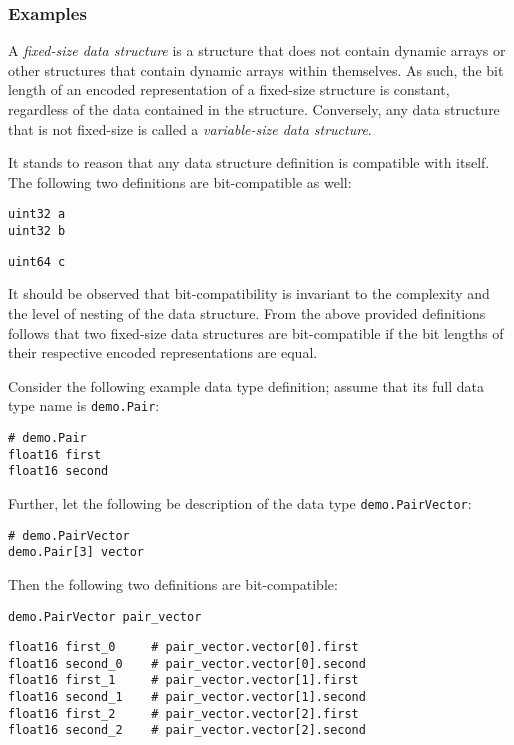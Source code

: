 \subsubsection{Examples}

A \emph{fixed-size data structure} is a structure that does not contain dynamic arrays
or other structures that contain dynamic arrays within themselves.
As such, the bit length of an encoded representation of a fixed-size structure is constant,
regardless of the data contained in the structure.
Conversely, any data structure that is not fixed-size is called a \emph{variable-size data structure}.

It stands to reason that any data structure definition is compatible with itself.
The following two definitions are bit-compatible as well:

\begin{verbatim}
uint32 a
uint32 b
\end{verbatim}

\begin{verbatim}
uint64 c
\end{verbatim}

It should be observed that bit-compatibility is invariant to the complexity and the level of nesting
of the data structure.
From the above provided definitions follows that two fixed-size data structures are bit-compatible if the
bit lengths of their respective encoded representations are equal.

Consider the following example data type definition; assume that its full data type name is
\verb|demo.Pair|:

\begin{verbatim}
# demo.Pair
float16 first
float16 second
\end{verbatim}

Further, let the following be description of the data type \verb|demo.PairVector|:

\begin{verbatim}
# demo.PairVector
demo.Pair[3] vector
\end{verbatim}

Then the following two definitions are bit-compatible:

\begin{verbatim}
demo.PairVector pair_vector
\end{verbatim}

\begin{verbatim}
float16 first_0     # pair_vector.vector[0].first
float16 second_0    # pair_vector.vector[0].second
float16 first_1     # pair_vector.vector[1].first
float16 second_1    # pair_vector.vector[1].second
float16 first_2     # pair_vector.vector[2].first
float16 second_2    # pair_vector.vector[2].second
\end{verbatim}

